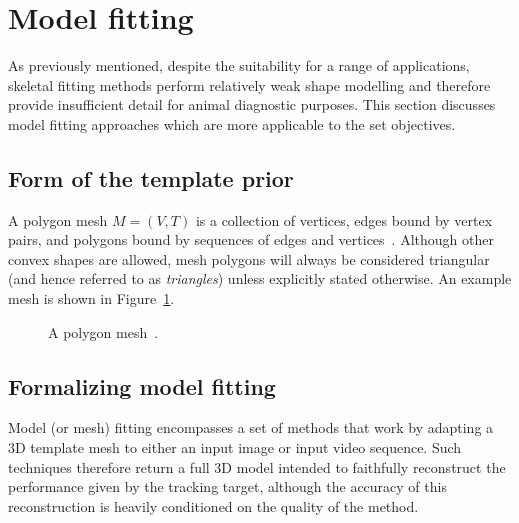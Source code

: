 \clearpage
\section{Model fitting}
    As previously mentioned, despite the suitability for a range of applications, skeletal fitting methods perform relatively weak shape modelling and therefore provide insufficient detail for animal diagnostic purposes. This section discusses model fitting approaches which are more applicable to the set objectives.

    \subsection{Form of the template prior}
    A polygon mesh $M = (V, T)$ is a collection of vertices, edges bound by vertex pairs, and polygons bound by sequences of edges and vertices~\cite{smith2006vertex}. Although other convex shapes are allowed, mesh polygons will always be considered triangular (and hence referred to as \emph{triangles}) unless explicitly stated otherwise. An example mesh is shown in Figure~\ref{fig:polygon_mesh}. 
    
    \begin{figure}[H] %
        \caption{A polygon mesh~\cite{polygon_mesh}.}
        \label{fig:polygon_mesh}
    \end{figure}

    \subsection{Formalizing model fitting}
    Model (or mesh) fitting encompasses a set of methods that work by adapting a 3D template mesh to either an input image or input video sequence. Such techniques therefore return a full 3D model intended to faithfully reconstruct the performance given by the tracking target, although the accuracy of this reconstruction is heavily conditioned on the quality of the method.

